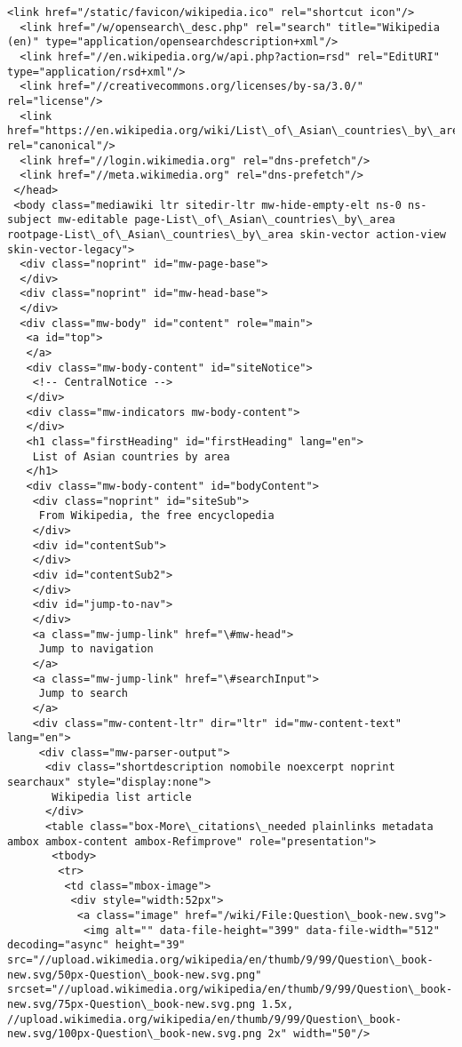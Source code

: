 \documentclass[11pt]{article}
\begin{document}
\begin{Verbatim}[commandchars=\\\{\}]
  <link href="/static/favicon/wikipedia.ico" rel="shortcut icon"/>
  <link href="/w/opensearch\_desc.php" rel="search" title="Wikipedia (en)" type="application/opensearchdescription+xml"/>
  <link href="//en.wikipedia.org/w/api.php?action=rsd" rel="EditURI" type="application/rsd+xml"/>
  <link href="//creativecommons.org/licenses/by-sa/3.0/" rel="license"/>
  <link href="https://en.wikipedia.org/wiki/List\_of\_Asian\_countries\_by\_area" rel="canonical"/>
  <link href="//login.wikimedia.org" rel="dns-prefetch"/>
  <link href="//meta.wikimedia.org" rel="dns-prefetch"/>
 </head>
 <body class="mediawiki ltr sitedir-ltr mw-hide-empty-elt ns-0 ns-subject mw-editable page-List\_of\_Asian\_countries\_by\_area rootpage-List\_of\_Asian\_countries\_by\_area skin-vector action-view skin-vector-legacy">
  <div class="noprint" id="mw-page-base">
  </div>
  <div class="noprint" id="mw-head-base">
  </div>
  <div class="mw-body" id="content" role="main">
   <a id="top">
   </a>
   <div class="mw-body-content" id="siteNotice">
    <!-- CentralNotice -->
   </div>
   <div class="mw-indicators mw-body-content">
   </div>
   <h1 class="firstHeading" id="firstHeading" lang="en">
    List of Asian countries by area
   </h1>
   <div class="mw-body-content" id="bodyContent">
    <div class="noprint" id="siteSub">
     From Wikipedia, the free encyclopedia
    </div>
    <div id="contentSub">
    </div>
    <div id="contentSub2">
    </div>
    <div id="jump-to-nav">
    </div>
    <a class="mw-jump-link" href="\#mw-head">
     Jump to navigation
    </a>
    <a class="mw-jump-link" href="\#searchInput">
     Jump to search
    </a>
    <div class="mw-content-ltr" dir="ltr" id="mw-content-text" lang="en">
     <div class="mw-parser-output">
      <div class="shortdescription nomobile noexcerpt noprint searchaux" style="display:none">
       Wikipedia list article
      </div>
      <table class="box-More\_citations\_needed plainlinks metadata ambox ambox-content ambox-Refimprove" role="presentation">
       <tbody>
        <tr>
         <td class="mbox-image">
          <div style="width:52px">
           <a class="image" href="/wiki/File:Question\_book-new.svg">
            <img alt="" data-file-height="399" data-file-width="512" decoding="async" height="39" src="//upload.wikimedia.org/wikipedia/en/thumb/9/99/Question\_book-new.svg/50px-Question\_book-new.svg.png" srcset="//upload.wikimedia.org/wikipedia/en/thumb/9/99/Question\_book-new.svg/75px-Question\_book-new.svg.png 1.5x, //upload.wikimedia.org/wikipedia/en/thumb/9/99/Question\_book-new.svg/100px-Question\_book-new.svg.png 2x" width="50"/>

\end{Verbatim}
\end{document}
